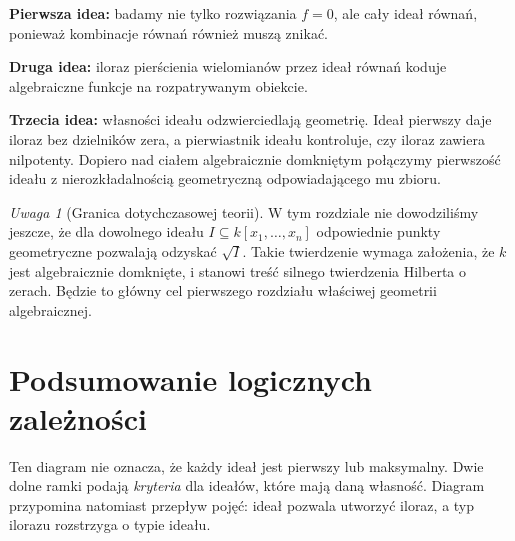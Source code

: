 \documentclass[11pt,a4paper,openany]{report}
\numberwithin{equation}{section}
\theoremstyle{plain}
\theoremstyle{definition}
\theoremstyle{remark}
\newtheorem{uwaga}[twierdzenie]{Uwaga}
\newcommand{\kerf}{\operatorname{ker}}
\begin{document}
\textbf{Pierwsza idea:} badamy nie tylko rozwiązania $f=0$, ale cały
ideał równań, ponieważ kombinacje równań również muszą znikać.

\textbf{Druga idea:} iloraz pierścienia wielomianów przez ideał równań
koduje algebraiczne funkcje na rozpatrywanym obiekcie.

\textbf{Trzecia idea:} własności ideału odzwierciedlają geometrię.
Ideał pierwszy daje iloraz bez dzielników zera,
a pierwiastnik ideału kontroluje, czy iloraz zawiera nilpotenty.
Dopiero nad ciałem algebraicznie domkniętym połączymy pierwszość
ideału z nierozkładalnością geometryczną odpowiadającego mu zbioru.

\begin{uwaga}[Granica dotychczasowej teorii]
W tym rozdziale nie dowodziliśmy jeszcze, że dla dowolnego ideału
$I\subseteq k[x_1,\dots,x_n]$ odpowiednie punkty geometryczne
pozwalają odzyskać $\sqrt I$. Takie twierdzenie wymaga
założenia, że $k$ jest algebraicznie domknięte, i stanowi treść
silnego twierdzenia Hilberta o zerach. Będzie to główny cel
pierwszego rozdziału właściwej geometrii algebraicznej.
\end{uwaga}

\section{Podsumowanie logicznych zależności}

\begin{center}
\end{center}

Ten diagram nie oznacza, że każdy ideał jest pierwszy lub maksymalny.
Dwie dolne ramki podają \emph{kryteria} dla ideałów, które mają
daną własność. Diagram przypomina natomiast przepływ pojęć:
ideał pozwala utworzyć iloraz, a typ ilorazu rozstrzyga o typie ideału.
\end{document}
